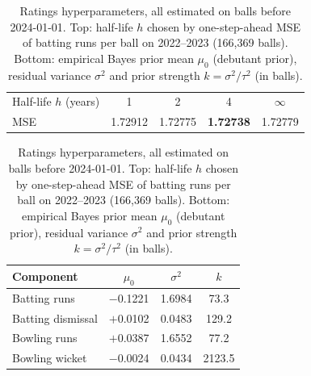 \begin{table}[t]\centering\small
\caption{Ratings hyperparameters, all estimated on balls before 2024-01-01. Top: half-life $h$ chosen by one-step-ahead MSE of batting runs per ball on 2022--2023 (166,369 balls). Bottom: empirical Bayes prior mean $\mu_0$ (debutant prior), residual variance $\sigma^2$ and prior strength $k=\sigma^2/\tau^2$ (in balls).}\label{tab:ratings}
\begin{tabular}{lcccc}\toprule
Half-life $h$ (years) & 1 & 2 & 4 & $\infty$\\
MSE & 1.72912 & 1.72775 & \textbf{1.72738} & 1.72779\\\bottomrule\end{tabular}

\vspace{6pt}
\begin{tabular}{lccc}\toprule
Component & $\mu_0$ & $\sigma^2$ & $k$\\\midrule
Batting runs & $-$0.1221 & 1.6984 & 73.3\\
Batting dismissal & $+$0.0102 & 0.0483 & 129.2\\
Bowling runs & $+$0.0387 & 1.6552 & 77.2\\
Bowling wicket & $-$0.0024 & 0.0434 & 2123.5\\
\bottomrule\end{tabular}
\end{table}
